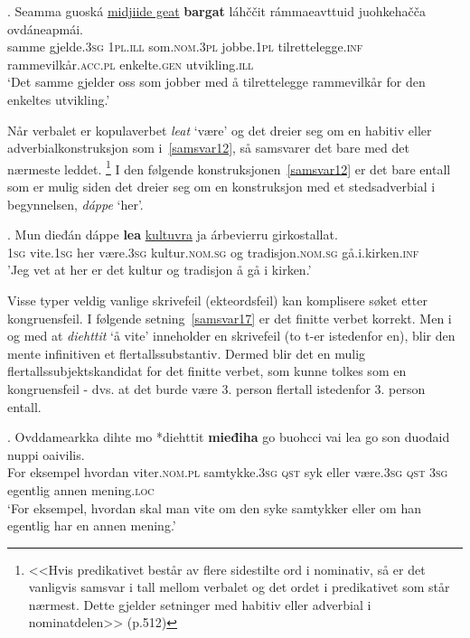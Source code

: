 \documentclass{flammie}
\begin{document}
\exg. Seamma guoská \underline{midjiide geat} \textbf{bargat} láhččit rámmaeavttuid juohkehačča ovdáneapmái.\label{samsvar15}\\
samme gjelde\textsc{.3sg} {\textsc{1pl.ill} som\textsc{.nom.3pl}} jobbe\textsc{.1pl} tilrettelegge\textsc{.inf} rammevilkår\textsc{.acc.pl} enkelte\textsc{.gen} utvikling\textsc{.ill}\\
`Det samme gjelder oss som {jobber} med å tilrettelegge rammevilkår for den enkeltes utvikling.'


Når verbalet er kopulaverbet \textit{leat} `være' og det dreier seg om en
habitiv eller adverbialkonstruksjon som i~\ref{samsvar12}, så samsvarer det bare
med det nærmeste leddet. \cite[s.512]{Nickel1994}\footnote{<<Hvis predikativet
består av flere sidestilte ord i nominativ, så er det vanligvis samsvar i tall
mellom verbalet og det ordet i predikativet som står nærmest. Dette gjelder
setninger med habitiv eller adverbial i nominatdelen>> (p.512)} I den følgende
konstruksjonen~\ref{samsvar12} er det bare entall som er mulig siden det dreier
seg om en konstruksjon med et stedsadverbial i begynnelsen, \textit{dáppe}
`her'.

\exg. Mun dieđán dáppe \textbf{lea} \underline{kultuvra} ja árbevierru girkostallat.\label{samsvar12}\\
\textsc{1sg} vite\textsc{.1sg} her være\textsc{.3sg} kultur\textsc{.nom.sg} og tradisjon\textsc{.nom.sg} gå.i.kirken\textsc{.inf}\\
'Jeg vet at her er det kultur og tradisjon å gå i kirken.'

Visse typer veldig vanlige skrivefeil (ekteordsfeil) kan komplisere søket etter
kongruensfeil.  I følgende setning~\ref{samsvar17} er det finitte verbet
korrekt.  Men i og med at \textit{diehttit} `å vite' inneholder en skrivefeil
(to t-er istedenfor en), blir den mente infinitiven et flertallssubstantiv.
Dermed blir det en mulig flertallssubjektskandidat for det finitte verbet, som
kunne tolkes som en kongruensfeil - dvs. at det burde være 3. person flertall
istedenfor 3. person entall.

\exg. {Ovddamearkka dihte} mo *diehttit \textbf{mieđiha} go buohcci vai lea go son duođaid nuppi oaivilis.\label{samsvar17}\\
{For eksempel} hvordan viter\textsc{.nom.pl} samtykke\textsc{.3sg} \textsc{qst} syk eller være\textsc{.3sg} \textsc{qst} \textsc{3sg} egentlig annen mening\textsc{.loc}\\
`For eksempel, hvordan skal man vite om den syke {samtykker} eller om han egentlig har en annen mening.'
\end{document}
